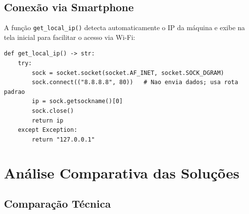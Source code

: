 \documentclass[12pt,a4paper]{article}
\begin{document}
\subsection{Conex\~ao via Smartphone}

A fun\c{c}\~ao \texttt{get\_local\_ip()} detecta automaticamente o IP da m\'aquina
e exibe na tela inicial para facilitar o acesso via Wi-Fi:

\begin{lstlisting}[caption={Detec\c{c}\~ao autom\'atica de IP local}]
def get_local_ip() -> str:
    try:
        sock = socket.socket(socket.AF_INET, socket.SOCK_DGRAM)
        sock.connect(("8.8.8.8", 80))   # Nao envia dados; usa rota padrao
        ip = sock.getsockname()[0]
        sock.close()
        return ip
    except Exception:
        return "127.0.0.1"
\end{lstlisting}

\section{An\'alise Comparativa das Solu\c{c}\~oes}
\label{sec:comparativo}

\subsection{Compara\c{c}\~ao T\'ecnica}
\end{document}
